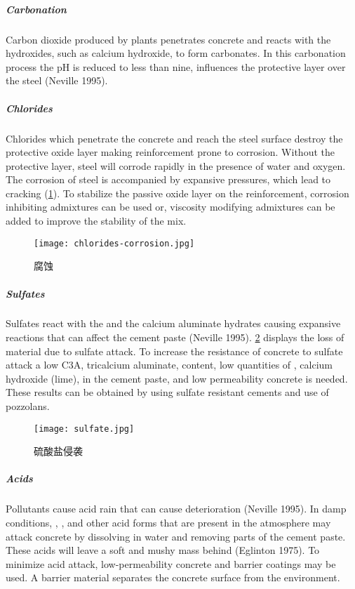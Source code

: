 \subparagraph{Carbonation}
Carbon dioxide produced by plants penetrates concrete and reacts with the hydroxides, such as calcium hydroxide, to form carbonates. In this carbonation process the pH is reduced to less than nine, influences the protective layer over the steel (Neville 1995).

\subparagraph{Chlorides}
Chlorides which penetrate the concrete and reach the steel surface destroy the protective oxide layer making reinforcement prone to corrosion. Without the protective layer, steel will corrode rapidly in the presence of water and oxygen. The corrosion of steel is accompanied by expansive pressures, which lead to cracking (\cref{fig:chlorides-corrosion}). To stabilize the passive oxide layer on the reinforcement, corrosion inhibiting admixtures can be used or, viscosity modifying admixtures can be added to improve the stability of the mix.

\begin{figure}
  \texttt{[image: chlorides-corrosion.jpg]}
  \caption{腐蚀}
  \label{fig:chlorides-corrosion}
\end{figure}

\subparagraph{Sulfates}
Sulfates react with the  and the calcium aluminate hydrates causing expansive reactions that can affect the cement paste (Neville 1995). \cref{fig:sulfate} displays the loss of material due to sulfate attack. To increase the resistance of concrete to sulfate attack a low C3A, tricalcium aluminate, content, low quantities of , calcium hydroxide (lime), in the cement paste, and low permeability concrete is needed. These results can be obtained by using sulfate resistant cements and use of pozzolans.

\begin{figure}
  \texttt{[image: sulfate.jpg]}
  \caption{硫酸盐侵袭}
  \label{fig:sulfate}
\end{figure}


\subparagraph{Acids}
Pollutants cause acid rain that can cause deterioration (Neville 1995). In damp conditions, , ,  and other acid forms that are present in the atmosphere may attack concrete by dissolving in water and removing parts of the cement paste. These acids will leave a soft and mushy mass behind (Eglinton 1975). To minimize acid attack, low-permeability concrete and barrier coatings may be used. A barrier material separates the concrete surface from
the environment.


